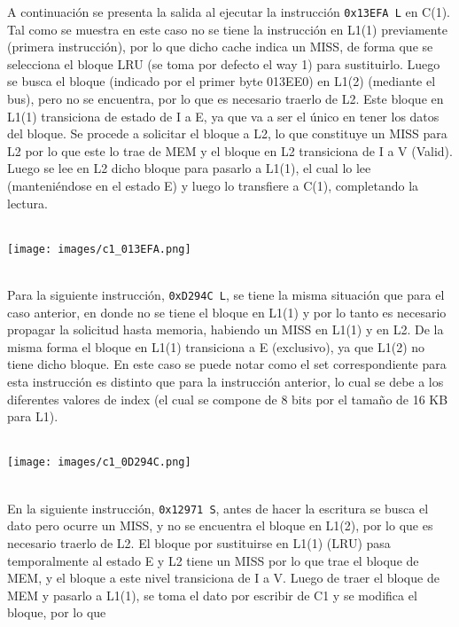 \documentclass {article}
\begin{document}
A continuación se presenta la salida al ejecutar la instrucción \texttt{0x13EFA L} en C(1). Tal como
se muestra en este caso no se tiene la instrucción en L1(1) previamente (primera instrucción), por
lo que dicho cache indica un MISS, de forma que se selecciona el bloque LRU (se toma por defecto el
way 1) para sustituirlo. Luego se busca el bloque (indicado por el primer byte 013EE0) en L1(2)
(mediante el bus), pero no se encuentra, por lo que es necesario traerlo de L2. Este bloque en L1(1)
transiciona de estado de I a E, ya que va a ser el único en tener los datos del bloque. Se procede a
solicitar el bloque a L2, lo que constituye un MISS para L2 por lo que este lo trae de MEM y el
bloque en L2 transiciona de I a V (Valid). Luego se lee en L2 dicho bloque para pasarlo a L1(1), el
cual lo lee (manteniéndose en el estado E) y luego lo transfiere a C(1), completando la lectura.
\\
\\
\begin{centering} \texttt{[image: images/c1\_013EFA.png]} \end{centering}
\\
Para la siguiente instrucción, \texttt{0xD294C L}, se tiene la misma situación que para el caso
anterior, en donde no se tiene el bloque en L1(1) y por lo tanto es necesario propagar la solicitud
hasta memoria, habiendo un MISS en L1(1) y en L2. De la misma forma el bloque en L1(1) transiciona a
E (exclusivo), ya que L1(2) no tiene dicho bloque. En este caso se puede notar como el set
correspondiente para esta instrucción es distinto que para la instrucción anterior, lo cual se debe
a los diferentes valores de index (el cual se compone de 8 bits por el tamaño de 16 KB para L1).
\\
\\
\begin{centering} \texttt{[image: images/c1\_0D294C.png]} \end{centering}
\\
En la siguiente instrucción, \texttt{0x12971 S}, antes de hacer la escritura se busca el dato pero
ocurre un MISS, y no se encuentra el bloque en L1(2), por lo que es necesario traerlo de L2. El
bloque por sustituirse en L1(1) (LRU) pasa temporalmente al estado E y L2 tiene un MISS por lo que
trae el bloque de MEM, y el bloque a este nivel transiciona de I a V. Luego de traer el bloque de
MEM y pasarlo a L1(1), se toma el dato por escribir de C1 y se modifica el bloque, por lo que 
\\
\end{document}
